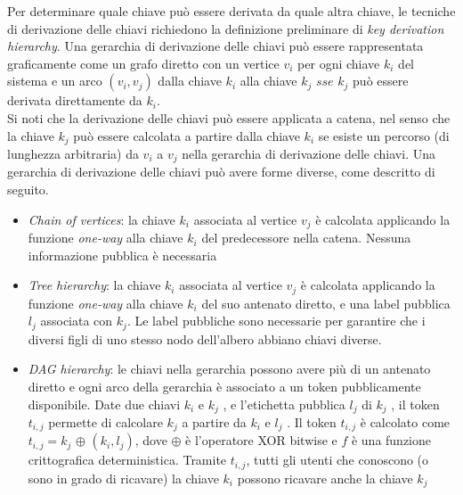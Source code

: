 Per determinare quale chiave può essere derivata da quale altra chiave, le tecniche di derivazione delle chiavi richiedono la definizione preliminare di \textit{key derivation hierarchy}. Una gerarchia di derivazione delle chiavi può essere rappresentata graficamente come un grafo diretto con un vertice $v_i$ per ogni chiave $k_i$ del sistema e un arco $(v_i,v_j)$ dalla chiave $k_i$ alla chiave $k_j$ $sse$ $k_j$ può essere derivata direttamente da $k_i$.\\
\newline
Si noti che la derivazione delle chiavi può essere applicata a catena, nel senso che la chiave $k_j$ può essere calcolata a partire dalla chiave $k_i$ se esiste un percorso (di lunghezza arbitraria) da $v_i$ a $v_j$ nella gerarchia di derivazione delle chiavi.
Una gerarchia di derivazione delle chiavi può avere forme diverse, come descritto di seguito.
\begin{itemize}
    \item \textit{Chain of vertices}: la chiave $k_i$ associata al vertice $v_j$ è calcolata applicando la funzione \textit{one-way} alla chiave $k_i$ del predecessore nella catena. Nessuna informazione pubblica è necessaria
    \item \textit{Tree hierarchy}: la chiave $k_i$ associata al vertice $v_j$ è calcolata applicando la funzione \textit{one-way} alla chiave $k_i$ del suo antenato diretto, e una label pubblica $l_j$ associata con $k_j$. Le label pubbliche sono necessarie per garantire che i diversi figli di uno stesso nodo dell'albero abbiano chiavi diverse.
    \item \textit{DAG hierarchy}: le chiavi nella gerarchia possono avere più di un antenato diretto e ogni arco della gerarchia è associato a un token pubblicamente disponibile. Date due chiavi $k_i$ e $k_j$ , e l'etichetta pubblica $l_j$ di $k_j$ , il token $t_{i,j}$ permette di calcolare $k_j$ a partire da $k_i$ e $l_j$ . Il token $t_{i,j}$ è calcolato come $t_{i,j}=k_j$ $\oplus$ $(k_i,l_j)$, dove $\oplus$ è l'operatore XOR bitwise e $f$ è una funzione crittografica deterministica. Tramite $t_{i,j}$, tutti gli utenti che conoscono (o sono in grado di ricavare) la chiave $k_i$ possono ricavare anche la chiave $k_j$
\end{itemize}

